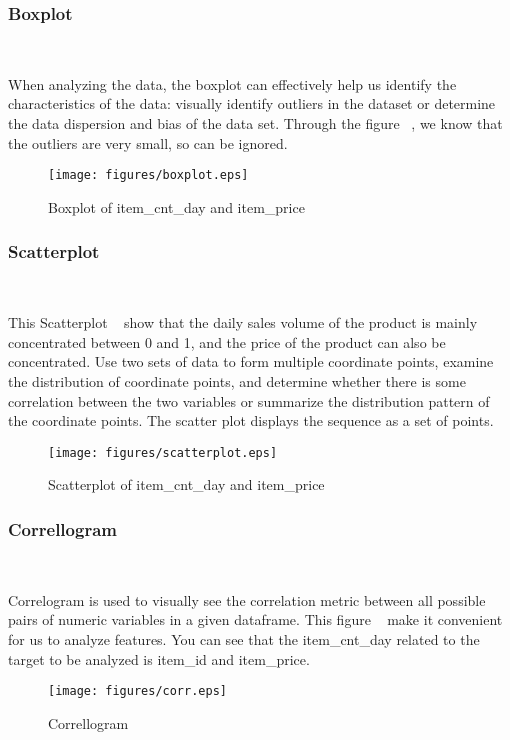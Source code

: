 \subsubsection{Boxplot}
\
 
When analyzing the data, 
the boxplot can effectively 
help us identify the characteristics of the data:
visually identify outliers in the dataset or
determine the data dispersion and 
bias of the data set. 
Through the figure ~, 
we know that the outliers are very small,
so can be ignored.


\begin{figure}[htbp]
	\centering
	\texttt{[image: figures/boxplot.eps]}
	\caption{Boxplot of item_cnt_day and item_price}\label{fig:boxplot}
\end{figure}


\subsubsection{Scatterplot} 
\

This Scatterplot ~ show 
that the daily sales volume 
of the product is mainly concentrated 
between 0 and 1, and the 
price of the product can also be concentrated. 
Use two sets of data to form multiple 
coordinate points, examine the distribution 
of coordinate points, and determine 
whether there is some correlation 
between the two variables or summarize 
the distribution pattern of the 
coordinate points. The scatter 
plot displays the sequence as a set of points.

\begin{figure}[htbp]
	\centering
	\texttt{[image: figures/scatterplot.eps]}
	\caption{Scatterplot of item_cnt_day and item_price}\label{fig:scatterplot}
\end{figure}

\subsubsection{Correllogram}
\

Correlogram is used to 
visually see the correlation metric 
between all possible pairs of numeric variables 
in a given dataframe. 
This figure ~ 
make it convenient for us to analyze features.
You can see that the item_cnt_day related 
to the target to be analyzed is item_id and item_price.

\begin{figure}[htbp]
	\centering
	\texttt{[image: figures/corr.eps]}
	\caption{Correllogram}\label{fig:corr}
\end{figure}


